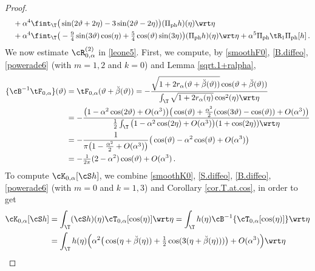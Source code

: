 \documentclass[a4paper,reqno,10pt]{article}
\begin{document}
\begin{proof}
\begin{align}
		&\quad +\alpha^4 \fint_{\T}\big(\sin(2\vartheta+2\eta)  -3\sin(2\vartheta-2\eta)\big) (\Pi_{\rm ph} h)(\eta) \wrt\eta \\
		&  \quad +\alpha^4 \fint_{\T} \big(-\tfrac94 \sin(3\vartheta)\cos(\eta) + \tfrac54 \cos(\vartheta) \sin(3\eta)  \big)(\Pi_{\rm ph} h)(\eta) \wrt\eta +\alpha^5\Pi_{\rm ph}\tR_{1}\Pi_{\rm ph}[h]  \,.\label{leone14} 
	\end{align} 
	We now estimate  $\cR_{0,\alpha}^{(2)}$ in \eqref{leone5}.
	First, we compute, by \eqref{smoothF0}, \eqref{B.diffeo}, \eqref{powerade6} (with $m=1,2$ and $k=0$) and Lemma \eqref{sqrt.1+ralpha},
		\begin{align}
				\{\cB^{-1}\tF_{0,\alpha} \}(\vartheta)  &= \tF_{0,\alpha}(\vartheta+\breve{\beta}(\vartheta))  = - \frac{\sqrt{1+2r_\alpha(\vartheta+\breve{\beta}(\vartheta))} \cos(\vartheta+\breve{\beta}(\vartheta))}{\int_{\T}\sqrt{1+2r_\alpha(\eta)}\cos^2(\eta)\wrt\eta}  \\
			& = - \frac{\big( 1- \alpha^2 \cos(2\vartheta) + O(\alpha^3) \big) \big( \cos(\vartheta) +\tfrac{\alpha^2}{2} (\cos(3\vartheta)-\cos(\vartheta)) + O(\alpha^3) \big)}{\frac12\int_{\T}\big(1-\alpha^2\cos(2\eta)+ O(\alpha^3)\big)(1+\cos(2\eta))\wrt\eta } \\
			& = - \frac{1}{\pi\big( 1 - \frac{\alpha^2}{2} + O(\alpha^3) \big)} \big( \cos(\vartheta) - \alpha^2 \cos(\vartheta) + O(\alpha^3) \big)\\
			& =- \tfrac{1}{2\pi}(2  - \alpha^2 )\cos(\vartheta)  + O(\alpha^3)\,.\label{cicap1}
		\end{align}
		To compute $\cK_{0,\alpha}[ \cS h]$,  we combine  \eqref{smoothK0}, \eqref{S.diffeo}, \eqref{B.diffeo}, \eqref{powerade6} (with $m=0$ and $k=1,3$) and Corollary \ref{cor.T.at.cos}, in order to get
			\begin{align}
				\cK_{0,\alpha}[ \cS h] & = \int_{\T} (\cS h)(\eta) \cT_{0,\alpha} [\cos(\eta)] \wrt \eta = \int_{\T} h (\eta) \cB^{-1} \{\cT_{0,\alpha}[\cos(\eta)] \}\wrt\eta \\
				& = \int_{\T} h (\eta) \Big( \alpha^2 \big(\cos(\eta+\breve{\beta}(\eta)) + \tfrac12 \cos(3(\eta+\breve{\beta}(\eta)))   \big) + O(\alpha^3)  \Big) \wrt\eta\\

\end{align}
\end{proof}
\end{document}
